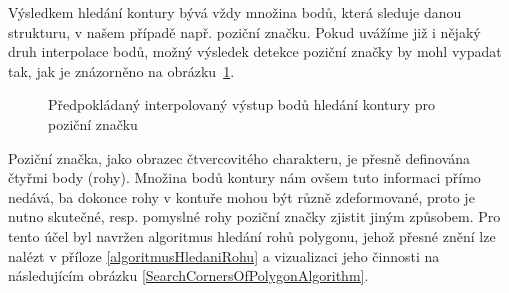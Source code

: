 Výsledkem hledání kontury bývá vždy množina bodů, která sleduje danou strukturu,
v našem případě např. poziční značku. Pokud uvážíme již i nějaký druh
interpolace bodů, možný výsledek detekce poziční značky by mohl vypadat tak,
jak je znázorněno na obrázku~\ref{FinderMarkContourDetection}.

\begin{figure}[H]
  \begin{center}
    \caption{Předpokládaný interpolovaný výstup bodů hledání kontury pro
    poziční značku}
    \label{FinderMarkContourDetection}
  \end{center}
\end{figure}

Poziční značka, jako obrazec čtvercovitého charakteru, je přesně definována
čtyřmi body (rohy). Množina bodů kontury nám ovšem tuto informaci přímo nedává,
ba dokonce rohy v kontuře mohou být různě zdeformované, proto je nutno skutečné,
resp. pomyslné rohy poziční značky zjistit jiným způsobem. Pro tento účel byl
navržen algoritmus hledání rohů polygonu, jehož přesné znění lze nalézt v
příloze \ref{algoritmusHledaniRohu} a vizualizaci jeho činnosti na následujícím
obrázku \ref{SearchCornersOfPolygonAlgorithm}.

